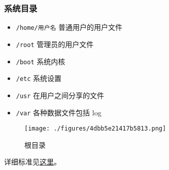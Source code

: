 \subsubsection{系统目录}
\begin{itemize}
\item \verb|/home/用户名| 普通用户的用户文件
\item \verb|/root| 管理员的用户文件
\item \verb|/boot| 系统内核
\item \verb|/etc| 系统设置
\item \verb|/usr| 在用户之间分享的文件
\item \verb|/var| 各种数据文件包括 log
\end{itemize}
\begin{figure}[ht]
\centering
\texttt{[image: ./figures/4dbb5e21417b5813.png]}
\caption{根目录} \label{fig_LinNt_2}
\end{figure}
详细标准见\href{https://www.pathname.com/fhs/}{这里}。

